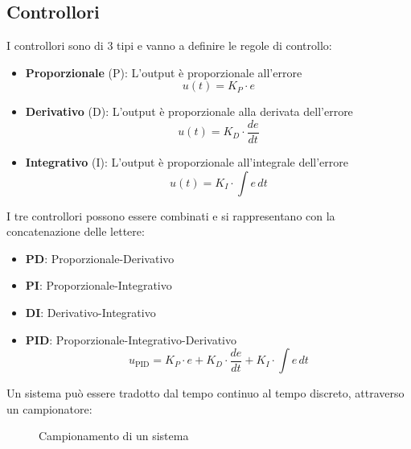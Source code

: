 \documentclass[a4paper]{article}
\begin{document}
\subsection{Controllori}
I controllori sono di 3 tipi e vanno a definire le regole di controllo:
\begin{itemize}
  \item \textbf{Proporzionale} (P): L'output è proporzionale all'errore
    \[
      u(t) = K_P \cdot e
    \]

  \item \textbf{Derivativo} (D): L'output è proporzionale alla derivata dell'errore
    \[
      u(t) = K_D \cdot \frac{de}{dt}
    \]

  \item \textbf{Integrativo} (I): L'output è proporzionale all'integrale dell'errore
    \[
      u(t) = K_I \cdot \int e \, dt
    \]
\end{itemize}
I tre controllori possono essere combinati e si rappresentano con la concatenazione
delle lettere:
\begin{itemize}
  \item \textbf{PD}: Proporzionale-Derivativo
  \item \textbf{PI}: Proporzionale-Integrativo
  \item \textbf{DI}: Derivativo-Integrativo
  \item \textbf{PID}: Proporzionale-Integrativo-Derivativo
    \[
      u_{\text{PID}} = K_P \cdot e + K_D \cdot \frac{de}{dt} + K_I \cdot \int e \, dt
    \] 
\end{itemize}

\vspace{1em}
\noindent
Un sistema può essere tradotto dal tempo continuo al tempo discreto, attraverso un
campionatore:
\begin{figure}[H]
  \centering
  \caption{Campionamento di un sistema}
\end{figure}
\end{document}
